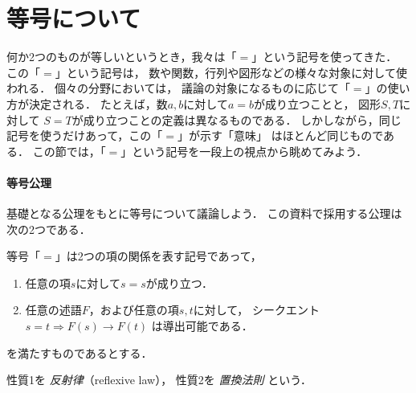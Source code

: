  \section{等号について}
 \label{sec:equal}
   何か2つのものが等しいというとき，我々は「$=$」という記号を使ってきた．
   この「$=$」という記号は，
   数や関数，行列や図形などの様々な対象に対して使われる．
   個々の分野においては，
   議論の対象になるものに応じて「$=$」の使い方が決定される．
   たとえば，数$a,  b$に対して$a = b$が成り立つことと，
   図形$S,  T$に対して
   $S=T$が成り立つことの定義は異なるものである．
   しかしながら，同じ記号を使うだけあって，この「$=$」が示す「意味」
   はほとんど同じものである．
   この節では，「$=$」という記号を一段上の視点から眺めてみよう．

   \paragraph{等号公理}
   基礎となる公理をもとに等号について議論しよう．
   この資料で採用する公理は次の2つである．
   
   \begin{axiom}[等号公理]
     等号「$=$」は2つの項の関係を表す記号であって，
     \begin{enumerate}[1. ]
       \item 任意の項$s$に対して$s =s$が成り立つ．
       \item 任意の述語$F$，および任意の項$s,  t$に対して，
             シークエント
             $s=t \Longrightarrow F(s) \to F(t) $
             は導出可能である．
     \end{enumerate}
     を満たすものであるとする．
   \end{axiom}
   性質1を
   \emph{反射律}（reflexive law），
   性質2を
   \emph{置換法則} という．

